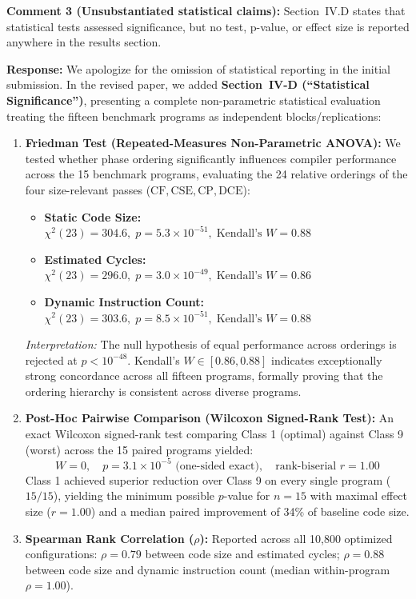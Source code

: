 \documentclass[10pt,a4paper]{article}
\begin{document}
\vspace{0.8em}
\begin{reviewercomment}
\textbf{Comment 3 (Unsubstantiated statistical claims):} Section~IV.D states that statistical tests assessed significance, but no test, p-value, or effect size is reported anywhere in the results section.
\end{reviewercomment}

\noindent \textbf{Response:} We apologize for the omission of statistical reporting in the initial submission. In the revised paper, we added \textbf{Section~IV-D (``Statistical Significance'')}, presenting a complete non-parametric statistical evaluation treating the fifteen benchmark programs as independent blocks/replications:
\begin{enumerate}[itemsep=1pt,parsep=0pt,topsep=2pt]
    \item \textbf{Friedman Test (Repeated-Measures Non-Parametric ANOVA):} We tested whether phase ordering significantly influences compiler performance across the 15 benchmark programs, evaluating the 24 relative orderings of the four size-relevant passes ($\text{CF}, \text{CSE}, \text{CP}, \text{DCE}$):
    \begin{itemize}[itemsep=1pt,parsep=0pt]
        \item \textbf{Static Code Size:} $\chi^2(23) = 304.6,\; p = 5.3 \times 10^{-51},\; \text{Kendall's } W = 0.88$
        \item \textbf{Estimated Cycles:} $\chi^2(23) = 296.0,\; p = 3.0 \times 10^{-49},\; \text{Kendall's } W = 0.86$
        \item \textbf{Dynamic Instruction Count:} $\chi^2(23) = 303.6,\; p = 8.5 \times 10^{-51},\; \text{Kendall's } W = 0.88$
    \end{itemize}
    \textit{Interpretation:} The null hypothesis of equal performance across orderings is rejected at $p < 10^{-48}$. Kendall's $W \in [0.86, 0.88]$ indicates exceptionally strong concordance across all fifteen programs, formally proving that the ordering hierarchy is consistent across diverse programs.
    \item \textbf{Post-Hoc Pairwise Comparison (Wilcoxon Signed-Rank Test):} An exact Wilcoxon signed-rank test comparing Class 1 (optimal) against Class 9 (worst) across the 15 paired programs yielded:
    \[ W = 0,\quad p = 3.1 \times 10^{-5} \text{ (one-sided exact)},\quad \text{rank-biserial } r = 1.00 \]
    Class 1 achieved superior reduction over Class 9 on every single program ($15/15$), yielding the minimum possible $p$-value for $n = 15$ with maximal effect size ($r = 1.00$) and a median paired improvement of 34\% of baseline code size.
    \item \textbf{Spearman Rank Correlation ($\rho$):} Reported across all 10,800 optimized configurations: $\rho = 0.79$ between code size and estimated cycles; $\rho = 0.88$ between code size and dynamic instruction count (median within-program $\rho = 1.00$).
\end{enumerate}
\end{document}
